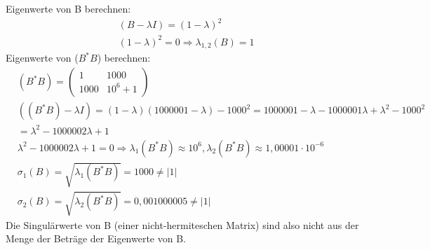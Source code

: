 Eigenwerte von B berechnen:
\begin{align*}
&(B-\lambda I)=(1-\lambda)^2\\
&(1-\lambda)^2=0 \Rightarrow \lambda_{1,2}(B)=1
\end{align*}
Eigenwerte von ($B^*B$) berechnen:
\begin{align*}
&(B^*B)=
\begin{pmatrix}
1 & 1000\\
1000 & 10^6+1
\end{pmatrix}\\
&((B^*B)-\lambda I)=(1-\lambda)(1000001-\lambda)-1000^2=1000001-\lambda-1000001\lambda+\lambda^2-1000^2\\ &=\lambda^2-1000002\lambda+1\\
&\lambda^2-1000002\lambda+1=0 \Rightarrow \lambda_{1}(B^*B)\approx 10^6, \lambda_{2}(B^*B) \approx 1,00001\cdot 10^{-6}\\
&\sigma_1(B)=\sqrt{\lambda_1(B^*B)}=1000 \neq |1|\\
&\sigma_2(B)=\sqrt{\lambda_2(B^*B)}=0,001000005 \neq|1|
\end{align*}
Die Singulärwerte von B (einer nicht-hermiteschen Matrix) sind also nicht aus der Menge der Beträge der Eigenwerte von B.